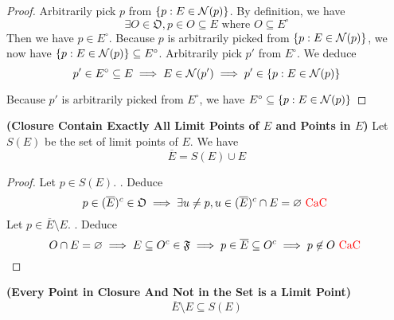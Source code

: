 \documentclass{report}
\begin{document}
\begin{proof}
Arbitrarily pick $p$ from $\{ p: E \in \mathcal{N}(p) \}$. By definition, we have 
\begin{equation}
\exists O\in \mathfrak{O}, p \in O \subseteq E\text{ where }O\subseteq E^\circ 
\end{equation}
Then we have $p \in E^\circ $. Because $p$ is arbitrarily picked from $\{ p:E \in \mathcal{N}(p) \}$, we now have $\{ p:E \in\mathcal{N}(p) \}\subseteq E^\circ $. Arbitrarily pick $p'$ from $E^\circ$. We deduce
\begin{equation}
p' \in E^\circ \subseteq E\implies E\in \mathcal{N}(p')\implies p' \in \{ p: E\in \mathcal{N}(p) \}
\end{equation}

Because $p'$ is arbitrarily picked from  $E^\circ $, we have $E^\circ \subseteq \{ p:E\in \mathcal{N}(p) \}$ 
\end{proof}
\begin{theorem}
\label{2.6.9}
\textbf{(Closure Contain Exactly All Limit Points of $E$ and Points in $E$)} Let $S(E)$ be the set of limit points of $E$. We have
\begin{equation}
\overline{E}= S(E)\cup  E
\end{equation}
\end{theorem}
\begin{proof}
Let $p \in S(E)$. . Deduce
\begin{equation}
p \in (\overline{E})^c \in \mathfrak{O}\implies \exists u\neq p, u \in (\overline{E})^c \cap E= \varnothing \text{ \textcolor{red}{CaC} }
\end{equation}
 Let $p \in \overline{E}\setminus E$. . Deduce
\begin{equation}
O \cap E=\varnothing \implies E\subseteq O^c\in\mathfrak{F} \implies p\in \overline{E}\subseteq O^c \implies p \not \in O\text{ \textcolor{red}{CaC} }
\end{equation}
\end{proof}
\begin{corollary}
\label{2.6.10}
\textbf{(Every Point in Closure And Not in the Set is a Limit Point)}
\begin{equation}
\overline{E}\setminus E\subseteq S(E)
\end{equation}
\end{corollary}
\end{document}
